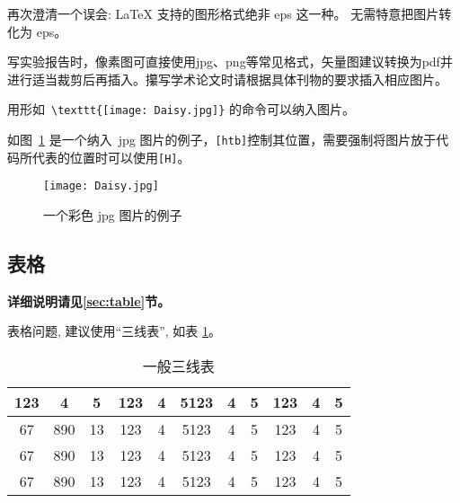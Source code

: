 再次\colorbox{red!45}{澄清一个误会}: \LaTeX{} 支持的图形格式绝非 eps 这一种。 无需特意把图片转化为 eps。

写实验报告时，像素图可直接使用jpg、png等常见格式，矢量图建议转换为pdf并进行适当裁剪后再插入。攥写学术论文时请根据具体刊物的要求插入相应图片。

用形如~\verb|\texttt{[image: Daisy.jpg]}| 的命令可以纳入图片。

如图~\ref{fig:1} 是一个纳入~jpg 图片的例子，\verb|[htb]|控制其位置，需要强制将图片放于代码所代表的位置时可以使用\verb|[H]|。

\begin{figure}[H]
\centering
  \texttt{[image: Daisy.jpg]}
  \caption{一个彩色 jpg 图片的例子}
  \label{fig:1}
\end{figure}

\subsection{表格}

\textbf{详细说明请见\ref{sec:table}节。}

表格问题, 建议使用“三线表”, 如表 \ref{tab:1}。

\begin{table}[htb]
\centering
\caption{一般三线表}
\label{tab:1}
    \begin{tabular}{c c c c c c c c c c c}
    \hline
    123 & 4  & 5  & 123 & 4 & 5123 & 4 & 5 & 123 & 4 & 5\\
    \hline
    67 & 890 & 13 & 123 & 4 & 5123 & 4 & 5 & 123 & 4 & 5\\
    67 & 890 & 13 & 123 & 4 & 5123 & 4 & 5 & 123 & 4 & 5\\
    67 & 890 & 13 & 123 & 4 & 5123 & 4 & 5 & 123 & 4 & 5\\
    \hline
    \end{tabular}
\end{table}
